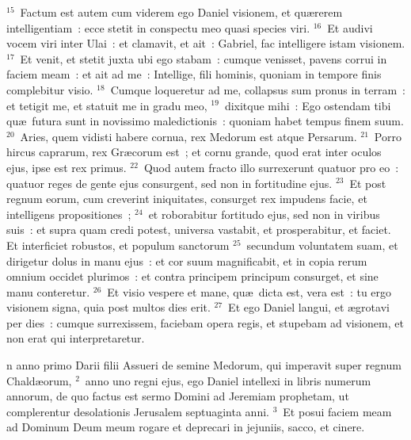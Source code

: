 ${}^{15}$~Factum est autem cum viderem ego Daniel visionem, et qu\ae rerem intelligentiam~: ecce stetit in conspectu meo quasi species viri.
${}^{16}$~Et audivi vocem viri inter Ulai~: et clamavit, et ait~: Gabriel, fac intelligere istam visionem.
${}^{17}$~Et venit, et stetit juxta ubi ego stabam~: cumque venisset, pavens corrui in faciem meam~: et ait ad me~: Intellige, fili hominis, quoniam in tempore finis complebitur visio.
${}^{18}$~Cumque loqueretur ad me, collapsus sum pronus in terram~: et tetigit me, et statuit me in gradu meo,
${}^{19}$~dixitque mihi~: Ego ostendam tibi qu\ae\ futura sunt in novissimo maledictionis~: quoniam habet tempus finem suum.
${}^{20}$~Aries, quem vidisti habere cornua, rex Medorum est atque Persarum.
${}^{21}$~Porro hircus caprarum, rex Gr\ae corum est~; et cornu grande, quod erat inter oculos ejus, ipse est rex primus.
${}^{22}$~Quod autem fracto illo surrexerunt quatuor pro eo~: quatuor reges de gente ejus consurgent, sed non in fortitudine ejus.
${}^{23}$~Et post regnum eorum, cum creverint iniquitates, consurget rex impudens facie, et intelligens propositiones~;
${}^{24}$~et roborabitur fortitudo ejus, sed non in viribus suis~: et supra quam credi potest, universa vastabit, et prosperabitur, et faciet. Et interficiet robustos, et populum sanctorum
${}^{25}$~secundum voluntatem suam, et dirigetur dolus in manu ejus~: et cor suum magnificabit, et in copia rerum omnium occidet plurimos~: et contra principem principum consurget, et sine manu conteretur.
${}^{26}$~Et visio vespere et mane, qu\ae\ dicta est, vera est~: tu ergo visionem signa, quia post multos dies erit.
${}^{27}$~Et ego Daniel langui, et \ae grotavi per dies~: cumque surrexissem, faciebam opera regis, et stupebam ad visionem, et non erat qui interpretaretur.

\bchapter
{}n anno primo Darii filii Assueri de semine Medorum, qui imperavit super regnum Chald\ae orum,
${}^{2}$~anno uno regni ejus, ego Daniel intellexi in libris numerum annorum, de quo factus est sermo Domini ad Jeremiam prophetam, ut complerentur desolationis Jerusalem septuaginta anni.
${}^{3}$~Et posui faciem meam ad Dominum Deum meum rogare et deprecari in jejuniis, sacco, et cinere.


